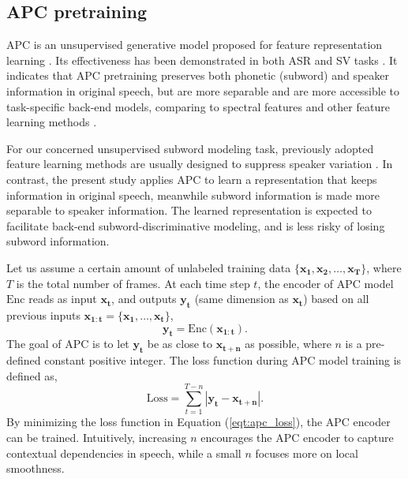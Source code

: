 \documentclass[a4paper]{article}
\begin{document}
\subsection{APC pretraining}
APC is an unsupervised generative model proposed for feature representation learning \cite{Chung2019}. 
Its effectiveness has been demonstrated in both ASR and SV tasks \cite{Chung2019}. It indicates that APC pretraining preserves both phonetic (subword) and speaker information in original speech,  but are more  separable and are more accessible to task-specific back-end models, comparing to spectral features and other feature learning methods \cite{Chung2019}. 

For our concerned unsupervised subword modeling task, previously adopted feature learning methods 
are usually designed to suppress speaker variation \cite{Feng2019improving,heck2017feature}. In contrast, the present study applies APC to learn a representation that keeps information in original speech, meanwhile subword information is made more separable to speaker information. The learned representation is expected to facilitate back-end subword-discriminative modeling, and is less risky of losing subword information.



Let us assume a certain amount of unlabeled training data $\{\bm{x_1}, \bm{x_2}, \ldots, \bm{x_T}\}$, where $T$ is the total number of frames. At each time step $t$, the encoder of APC model $\textrm{Enc}$ reads as input
$\bm{x_t}$, 
and outputs $\bm{y_t}$ (same dimension as $\bm{x_t}$) based on all previous inputs $\bm{x_{1:t}}=\{\bm{x_1},\ldots,\bm{x_t}\}$,
\begin{equation}
    \bm{y_t} = \textrm{Enc} (\bm{x_{1:t}}).
    \label{eqt:enc}
\end{equation}
The goal of APC is to let $\bm{y_t}$ be as close to $\bm{x_{t+n}}$ as possible, where $n$ is a pre-defined constant positive integer. The loss function during APC model training is defined as,
\begin{equation}
    \textrm{Loss} = \sum_{t=1}^{T-n} \left| \bm{y_t} - \bm{x_{t+n}} \right|.
    \label{eqt:apc_loss}
\end{equation}
By minimizing the loss function in Equation (\ref{eqt:apc_loss}), the APC encoder can be trained. Intuitively, increasing $n$ encourages the APC encoder to capture contextual dependencies in speech, 
while a small $n$ focuses more on local smoothness.
 
\end{document}
